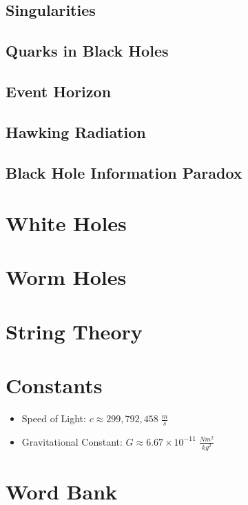 \documentclass{article}
\begin{document}
\subsection{Singularities}


\subsection{Quarks in Black Holes}


\subsection{Event Horizon}


\subsection{Hawking Radiation}


\subsection{Black Hole Information Paradox}




\section{White Holes}




\section{Worm Holes}



\section{String Theory}



\section{Constants}\label{sec:constants}
\begin{itemize}
    \item Speed of Light: $c \approx 299,792,458\;\frac{m}{s}$
    \item Gravitational Constant: $G \approx 6.67 \times 10^{-11}\;\frac{Nm^2}{kg^2}$
\end{itemize}

\section{Word Bank}
\end{document}
